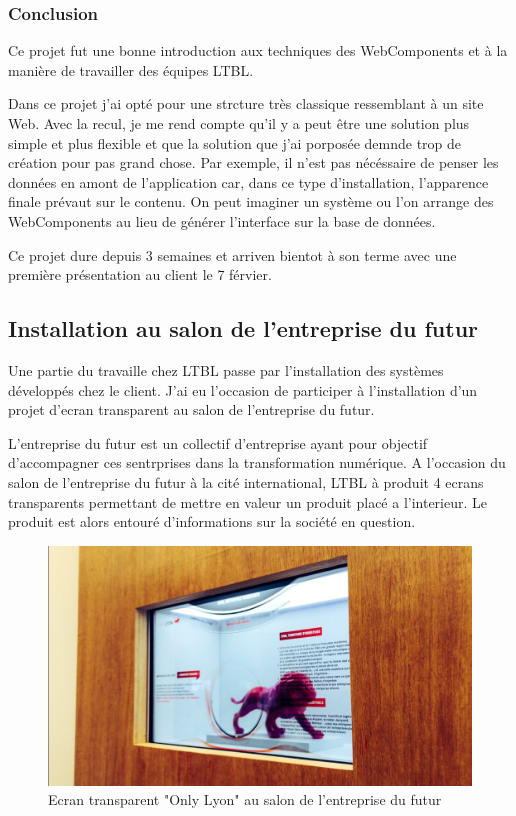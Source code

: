 \documentclass{article}
\begin{document}
\subsubsection{Conclusion}

Ce projet fut une bonne introduction aux techniques des WebComponents et à la manière de travailler des équipes LTBL.

Dans ce projet j'ai opté pour une strcture très classique ressemblant à un site Web.
Avec la recul, je me rend compte qu'il y a peut être une solution plus simple et plus flexible et que la solution que j'ai porposée demnde trop de création pour pas grand chose.
Par exemple, il n'est pas nécéssaire de penser les données en amont de l'application car, dans ce type d'installation, l'apparence finale prévaut sur le contenu.
On peut imaginer un système ou l'on arrange des WebComponents au lieu de générer l'interface sur la base de données.

Ce projet dure depuis 3 semaines et arriven bientot à son terme avec une première présentation au client le 7 férvier.

\subsection{Installation au salon de l'entreprise du futur}

Une partie du travaille chez LTBL passe par l'installation des systèmes développés chez le client.
J'ai eu l'occasion de participer à l'installation d'un projet d'ecran transparent au salon de l'entreprise du futur.

L'entreprise du futur est un collectif d'entreprise ayant pour objectif d'accompagner ces sentrprises dans la transformation numérique.
A l'occasion du salon de l'entreprise du futur à la cité international, LTBL à produit 4 ecrans transparents permettant de mettre en valeur un produit placé a l'interieur.
Le produit est alors entouré d'informations sur la société en question.

\begin{figure}[h]
    \centering
    \includegraphics[scale=0.3]{ecran-transparent.jpg}
    \caption{Ecran transparent "Only Lyon" au salon de l'entreprise du futur}
\end{figure}
\end{document}
